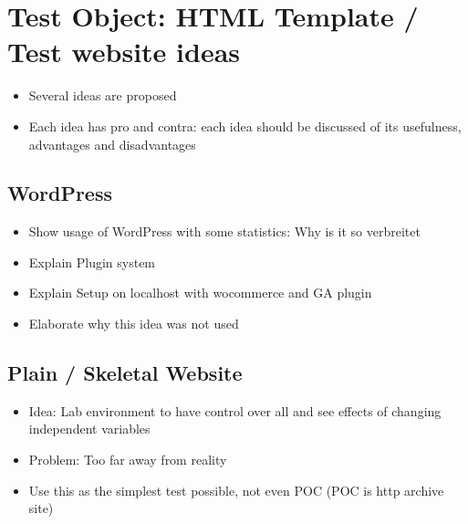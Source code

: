 \section{Test Object: HTML Template / Test website ideas}


\begin{itemize}
\item Several ideas are proposed
\item Each idea has pro and contra: each idea should be discussed of its usefulness, advantages and disadvantages
\end{itemize}





\subsection{WordPress}

\begin{itemize}
    \item Show usage of WordPress with some statistics: Why is it so verbreitet
    \item Explain Plugin system
    \item Explain Setup on localhost with wocommerce and GA plugin
    \item Elaborate why this idea was not used
\end{itemize}







\subsection{Plain / Skeletal Website}

\begin{itemize}
    \item Idea: Lab environment to have control over all and see effects of changing independent variables
    \item Problem: Too far away from reality
    \item Use this as the simplest test possible, not even POC (POC is http archive site)
\end{itemize}







